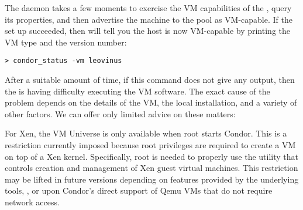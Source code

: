The  daemon takes a few moments to exercise the VM
capabilities of the , query its properties, and then 
advertise the machine to the pool as VM-capable.  If the set up 
succeeded, then  will tell you the host is now 
VM-capable by printing the VM type and the version number:

\begin{verbatim}
> condor_status -vm leovinus
\end{verbatim}

After a suitable amount of time, if this command does not give any output,
then the  is having difficulty executing the VM software.
The exact cause of the problem depends on the details of the VM, the local 
installation, and a variety of other factors. We can offer only limited 
advice on these matters:

For Xen, the VM Universe is only available when root starts Condor.
This is a restriction currently imposed because root privileges are 
required to create a VM on top of a Xen kernel. Specifically, root is needed 
to properly use the  utility that controls 
creation and management of Xen guest virtual machines. This restriction 
may be lifted in future versions depending on features provided by the 
underlying tools, , or upon Condor's direct 
support of Qemu VMs that do not require network access.
